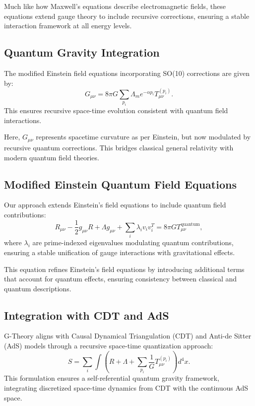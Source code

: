\documentclass[12]{amsart}
\theoremstyle{plain}
\begin{document}
Much like how Maxwell's equations describe electromagnetic fields, these equations extend gauge theory to include recursive corrections, ensuring a stable interaction framework at all energy levels.

\subsection{Quantum Gravity Integration}
The modified Einstein field equations incorporating SO(10) corrections are given by:
\begin{equation}
    G_{\mu\nu} = 8\pi G \sum_{p_i} \Lambda_m e^{-\alpha p_i} T_{\mu\nu}^{(p_i)}.
\end{equation}
This ensures recursive space-time evolution consistent with quantum field interactions.

Here, $G_{\mu\nu}$ represents spacetime curvature as per Einstein, but now modulated by recursive quantum corrections. This bridges classical general relativity with modern quantum field theories.

\subsection{Modified Einstein Quantum Field Equations}
Our approach extends Einstein’s field equations to include quantum field contributions:
\begin{equation}
    R_{\mu\nu} - \frac{1}{2} g_{\mu\nu} R + \Lambda g_{\mu\nu} + \sum_{i} \lambda_i v_i v_i^T = 8\pi G T_{\mu\nu}^{\text{quantum}},
\end{equation}
where $\lambda_i$ are prime-indexed eigenvalues modulating quantum contributions, ensuring a stable unification of gauge interactions with gravitational effects.

This equation refines Einstein's field equations by introducing additional terms that account for quantum effects, ensuring consistency between classical and quantum descriptions.

\subsection{Integration with CDT and AdS}
G-Theory aligns with Causal Dynamical Triangulation (CDT) and Anti-de Sitter (AdS) models through a recursive space-time quantization approach:
\begin{equation}
    S = \sum_{i} \int \left( R + \Lambda + \sum_{p_i} \frac{1}{G} T_{\mu\nu}^{(p_i)} \right) d^4x.
\end{equation}
This formulation ensures a self-referential quantum gravity framework, integrating discretized space-time dynamics from CDT with the continuous AdS space.
\end{document}
